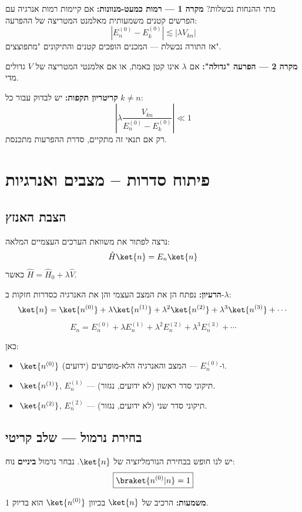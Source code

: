 \begin{notebox}{מתי ההנחות נכשלות?}
\textbf{מקרה 1 — רמות כמעט-מנוונות:} אם קיימות רמות אנרגיה עם הפרשים קטנים משמעותית מאלמנט המטריצה של ההפרעה:
\[
|E_n^{(0)} - E_k^{(0)}| \lesssim |\lambda V_{kn}|
\]
אז התורה נכשלת — המכנים הופכים קטנים והתיקונים "מתפוצצים".

\textbf{מקרה 2 — הפרעה "גדולה":} אם $\lambda$ אינו קטן באמת, או אם אלמנטי המטריצה של $V$ גדולים מדי.

\textbf{קריטריון תקפות:} יש לבדוק עבור כל $k \neq n$:
\[
\left|\lambda \frac{V_{kn}}{E_n^{(0)}-E_k^{(0)}}\right| \ll 1
\]
רק אם תנאי זה מתקיים, סדרת ההפרעות מתכנסת.
\end{notebox}


\section{פיתוח סדרות – מצבים ואנרגיות}

\subsection{הצבת האנזץ}
נרצה לפתור את משוואת הערכים העצמיים המלאה:
\[
\hat{H}\ket{n} = E_n\ket{n}
\]
כאשר $\hat{H} = \hat{H}_0 + \lambda\hat{V}$.

\textbf{הרעיון:} נפתח הן את המצב העצמי והן את האנרגיה כסדרות חזקות ב-$\lambda$:
\[
\ket{n} = \ket{n^{(0)}} + \lambda\ket{n^{(1)}} + \lambda^2\ket{n^{(2)}} + \lambda^3\ket{n^{(3)}} + \cdots
\]
\[
E_n = E_n^{(0)} + \lambda E_n^{(1)} + \lambda^2 E_n^{(2)} + \lambda^3 E_n^{(3)} + \cdots
\]

כאן:
\begin{itemize}
\item $\ket{n^{(0)}}$ ו-$E_n^{(0)}$ — המצב והאנרגיה הלא-מופרעים (ידועים).
\item $\ket{n^{(1)}}$, $E_n^{(1)}$ — תיקוני סדר ראשון (לא ידועים, נגזור).
\item $\ket{n^{(2)}}$, $E_n^{(2)}$ — תיקוני סדר שני (לא ידועים, נגזור).
\end{itemize}

\subsection{בחירת נרמול — שלב קריטי}

יש לנו חופש בבחירת הנורמליזציה של $\ket{n}$. נבחר נרמול \textbf{ביניים} נוח:
\[
\boxed{\braket{n^{(0)}|n} = 1}
\]

\textbf{משמעות:} הרכיב של $\ket{n}$ בכיוון $\ket{n^{(0)}}$ הוא בדיוק 1.

